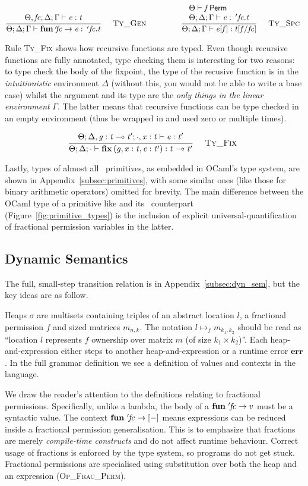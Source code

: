 \vspace{-\baselineskip}
\[
    {\displaystyle\frac{\begin{array}{l} \Theta , \mathit{fc} ; \Delta ; \Gamma \vdash \mathit{e} : \mathit{t} \\ \end{array}}{ \Theta ; \Delta ; \Gamma \vdash \mathbf{fun} {\: '\! \mathit{fc} } \rightarrow \mathit{e} : \: '\! \, \mathit{fc} . \mathit{t}}\quad\textsc{ {\textsc{Ty\_Gen}}{} }} \qquad\qquad {\displaystyle\frac{\begin{array}{l}  \Theta \vdash \mathit{f} \, \textsf{Perm} \\  \Theta ; \Delta ; \Gamma \vdash \mathit{e} : \: '\! \, \mathit{fc} . \mathit{t} \\ \end{array}}{ \Theta ; \Delta ; \Gamma \vdash \mathit{e} [ \mathit{f} ] : \mathit{t} [ \mathit{f} / \mathit{fc} ]}\quad\textsc{ {\textsc{Ty\_Spc}}{} }}
\]

Rule \textsc{Ty\_Fix} shows how recursive functions are typed. Even though
recursive functions are fully annotated, type checking them is interesting for
two reasons: to type check the body of the fixpoint, the type of the recusive
function is in the \emph{intuitionistic} environment $\Delta$ (without this,
you would not be able to write a base case) whilst the argument and its type
are the \emph{only things in the linear environment} $\Gamma$. The latter means
that recursive functions can be type checked in an empty environment (thus be
wrapped in  and used zero or multiple times).

\vspace{-\baselineskip}
\[
    {\displaystyle\frac{\begin{array}{l} \Theta ; \Delta , \mathit{g} : \mathit{t} \multimap \mathit{t'} ; \cdot , \mathit{x} : \mathit{t} \vdash \mathit{e} : \mathit{t'} \\ \end{array}}{ \Theta ; \Delta ; \cdot \vdash \mathbf{fix} \, ( \mathit{g} , \mathit{x} : \mathit{t} , \mathit{e} : \mathit{t'} ) : \mathit{t} \multimap \mathit{t'}}\quad\textsc{ {\textsc{Ty\_Fix}}{} }}
\]

Lastly, types of almost all \lang\ primitives, as embedded in OCaml's type
system, are shown in Appendix~\ref{subsec:primitives}, with some similar ones
(like those for binary arithmetic operators) omitted for brevity. The main
difference between the OCaml type of a primitive like  and its
\lang\ counterpart (Figure~\ref{fig:primitive_types}) is the inclusion of
explicit universal-quantification of fractional permission variables in the
latter.

\subsection{Dynamic Semantics}\label{subsec:semantics}

The full, small-step transition relation is in Appendix~\ref{subsec:dyn_sem},
but the key ideas are as follow.

Heaps $\sigma$ are multisets containing triples of an abstract location $l$,
a fractional permission $f$ and sized matrices $m_{n,k}$. The notation $l
\mapsto_f m_{k_1, k_2}$ should be read as ``location $l$ represents $f$
ownership over matrix $m$ (of size $k_1 \times k_2$)''.  Each heap-and-expression
either steps to another heap-and-expression or a runtime error $\mathbf{err}$.
In the full grammar definition we see a definition of values and contexts in
the language.

We draw the reader's attention to the definitions relating to fractional
permissions. Specifically, unlike a lambda, the body of a $\mathbf{fun}\ '\!f\!c
\rightarrow v$ must be a syntactic value. The context $\mathbf{fun}\ '\!f\!c
\rightarrow [-]$ means expressions can be reduced inside a fractional
permission generalisation. This is to emphasize that fractions are merely
\emph{compile-time constructs} and do not affect runtime behaviour. Correct
usage of fractions is enforced by the type system, so programs do not get
stuck. Fractional permissions are specialised using substitution over both the
heap and an expression (\textsc{Op\_Frac\_Perm}).

